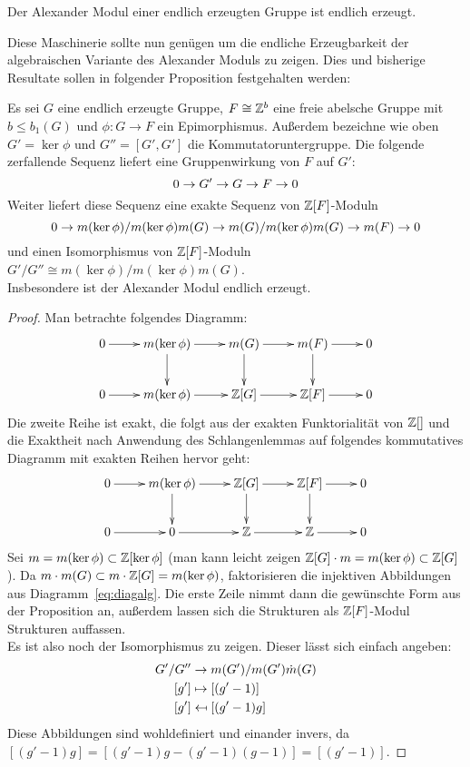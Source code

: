 \begin{lem}
	Der Alexander Modul einer endlich erzeugten Gruppe ist endlich erzeugt.
\end{lem}



Diese Maschinerie sollte nun genügen um die endliche Erzeugbarkeit der algebraischen Variante des Alexander Moduls zu zeigen. Dies und bisherige Resultate sollen in folgender Proposition festgehalten werden:

\begin{prop}
	Es sei $G$ eine endlich erzeugte Gruppe, $F \cong \mathbb{Z}^b$ eine freie abelsche Gruppe mit $b\leq b_1(G)$ und $\phi: G \to F$ ein Epimorphismus. Außerdem bezeichne wie oben $G'=\ker\phi$ und $G''=[G',G']$ die Kommutatoruntergruppe. Die folgende zerfallende Sequenz liefert eine Gruppenwirkung von $F$ auf $G'$:
	\[
		0\to G'\to G\to F\to0
	\]
	Weiter liefert diese Sequenz eine exakte Sequenz von $\mathbb{Z}[F]$-Moduln
	\[
		0\to m(\ker\phi)/m(\ker\phi)m(G)\to m(G)/m(\ker\phi)m(G)\to m(F)\to0
	\]
	und einen Isomorphismus von $\mathbb{Z}[F]$-Moduln $G'/G'' \cong m(\ker\phi)/m(\ker\phi)m(G)$.\\
	Insbesondere ist der Alexander Modul endlich erzeugt.
\end{prop}
\begin{proof}
		Man betrachte folgendes Diagramm:
		\begin{equation}
		\label{eq:diagalg}
			\begin{xy}
				\xymatrix{	0 \ar[r]&	m(\ker\phi) \ar[r] \ar[d]&	m(G) \ar[r] \ar[d]& m(F) \ar[r] \ar[d]&	0\\
							0 \ar[r]&	m(\ker\phi)	\ar[r] 		&	\ZZ[G] \ar[r]	&	\ZZ[F] \ar[r] &		0}
			\end{xy}			
		\end{equation}
		Die zweite Reihe ist exakt, die folgt aus der exakten Funktorialität von $\mathbb{Z}[]$ und die Exaktheit nach Anwendung des Schlangenlemmas auf folgendes kommutatives Diagramm mit exakten Reihen hervor geht:
		\[
			\begin{xy}
				\xymatrix{	0 \ar[r]&	m(\ker\phi) \ar[r] \ar[d]&	\ZZ[G] \ar[r] \ar[d]& \ZZ[F] \ar[r] \ar[d]&	0\\
							0 \ar[r]&		0		\ar[r] 		&	\ZZ \ar[r]	&	\ZZ \ar[r] &		0}
			\end{xy}
		\]
		Sei $m=m(\ker\phi)\subset \mathbb{Z}[\ker\phi]$ (man kann leicht zeigen $\mathbb{Z}[G]\cdot m = m(\ker\phi) \subset \mathbb{Z}[G]$). Da $m\cdot m(G)\subset m\cdot \mathbb{Z}[G] = m(\ker\phi)$, faktorisieren die injektiven Abbildungen aus Diagramm~\ref{eq:diagalg}. Die erste Zeile nimmt dann die gewünschte Form aus der Proposition an, außerdem lassen sich die Strukturen als $\mathbb{Z}[F]$-Modul Strukturen auffassen.\\
		Es ist also noch der Isomorphismus zu zeigen. Dieser lässt sich einfach angeben:
		\begin{align*}
			G'/G'' 	&\to 		m(G')/m(G')\dot m(G)\\
			[g']		&\mapsto	[(g'-1)]\\
			[g']		&\mathrel{\reflectbox{\ensuremath{\mapsto}}}  [(g'-1)g]
		\end{align*}
		Diese Abbildungen sind wohldefiniert und einander invers, da $[(g'-1)g]=[(g'-1)g-(g'-1)(g-1)]=[(g'-1)]$.
	\end{proof}	

